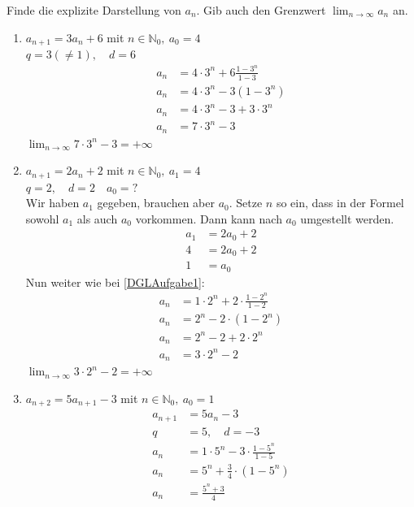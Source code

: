 \documentclass[11pt, a4paper]{article}
\newcommand\braces[1]{\left(#1\right)}
\begin{document}
Finde die explizite Darstellung von $a_n$. Gib auch den Grenzwert $\lim_{n \rightarrow \infty} a_n$ an.
\begin{enumerate}
	\item $a_{n+1} = 3 a_n + 6$ mit $n \in \mathbb{N}_0,\ a_0 = 4$ \label{DGLAufgabe1} \\
		$q=3 (\neq 1), \quad d=6$ \\
		\begin{align*}
			a_n &= 4 \cdot 3^n + 6 \frac{1-3^n}{1-3} \\
			a_n &= 4 \cdot 3^n - 3 (1-3^n) \\
			a_n &= 4 \cdot 3^n - 3 + 3 \cdot 3^n \\
			a_n &= 7 \cdot 3^n - 3 \tag{Explizite Darstellung}
		\end{align*}
		$\lim_{n \rightarrow \infty} 7 \cdot 3^n - 3 = +\infty$
	\item $a_{n+1} = 2 a_n +2$ mit $n \in \mathbb{N}_0,\ a_1 = 4$ \\
		$q=2, \quad d=2 \quad a_0 = ?$ \\
		Wir haben $a_1$ gegeben, brauchen aber $a_0$. Setze $n$ so ein, dass in der Formel sowohl $a_1$ als auch $a_0$ vorkommen. Dann kann nach $a_0$ umgestellt werden.
		\begin{align*}
			a_1 &= 2 a_0 +2 \\
			4 &= 2 a_0 +2 \\
			1 &= a_0
		\end{align*}
		Nun weiter wie bei \ref{DGLAufgabe1}:
		\begin{align*}
			a_n &= 1 \cdot 2^n + 2 \cdot \frac{1-2^n}{1-2} \\
			a_n &= 2^n - 2 \cdot \braces{1-2^n} \\
			a_n &= 2^n - 2 + 2 \cdot 2^n \\
			a_n &= 3 \cdot 2^n - 2
		\end{align*}
		$\lim_{n \rightarrow \infty} 3 \cdot 2^n - 2 = +\infty$
	\item $a_{n+2} = 5 a_{n+1} - 3$ mit $n \in \mathbb{N}_0,\ a_0 = 1$ \\
		\begin{align*}
			a_{n+1} &= 5 a_{n} - 3 \tag{Index-Shift} \\
			q &= 5, \quad d = -3 \\
			a_n &= 1 \cdot 5^n -3 \cdot \frac{1-5^n}{1-5} \\
			a_n &= 5^n + \frac{3}{4} \cdot (1-5^n) \\
			a_n &= \frac{5^n+3}{4}
		\end{align*}

\end{enumerate}
\end{document}
